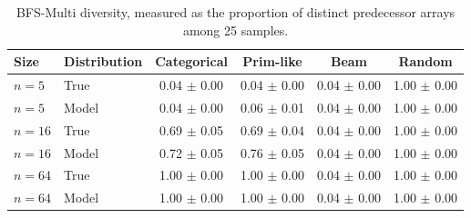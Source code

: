 \begin{table}[hbt!]
    \centering
    \small
    \begin{tabular}{llcccc}
        \toprule
        \textbf{Size} & \textbf{Distribution} & \textbf{Categorical} & \textbf{Prim-like} & \textbf{Beam} & \textbf{Random} \\
        \midrule
        $n=5$ & True & 0.04 $\pm$ 0.00 & 0.04 $\pm$ 0.00 & 0.04 $\pm$ 0.00 & 1.00 $\pm$ 0.00 \\
        $n=5$ & Model & 0.04 $\pm$ 0.00 & 0.06 $\pm$ 0.01 & 0.04 $\pm$ 0.00 & 1.00 $\pm$ 0.00 \\
        $n=16$ & True & 0.69 $\pm$ 0.05 & 0.69 $\pm$ 0.04 & 0.04 $\pm$ 0.00 & 1.00 $\pm$ 0.00 \\
        $n=16$ & Model & 0.72 $\pm$ 0.05 & 0.76 $\pm$ 0.05 & 0.04 $\pm$ 0.00 & 1.00 $\pm$ 0.00 \\
        $n=64$ & True & 1.00 $\pm$ 0.00 & 1.00 $\pm$ 0.00 & 0.04 $\pm$ 0.00 & 1.00 $\pm$ 0.00 \\
        $n=64$ & Model & 1.00 $\pm$ 0.00 & 1.00 $\pm$ 0.00 & 0.04 $\pm$ 0.00 & 1.00 $\pm$ 0.00 \\
        \bottomrule
    \end{tabular}
    \caption{BFS-Multi diversity, measured as the proportion of distinct predecessor arrays among 25 samples.}
    \label{tab:bfs-diversity}
\end{table}

